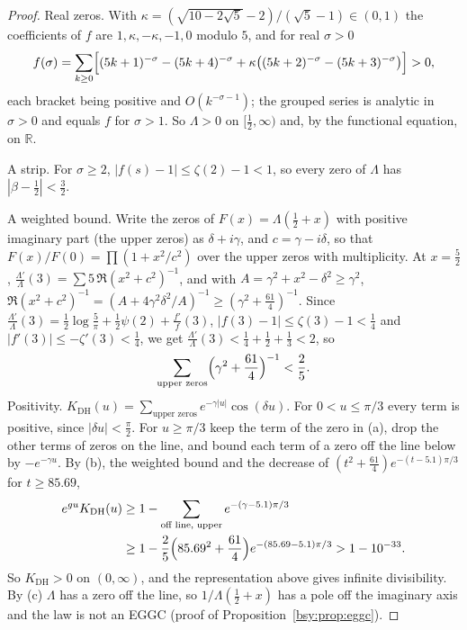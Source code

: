 \begin{proof}
Real zeros. With $\kappa=(\sqrt{10-2\sqrt5}-2)/(\sqrt5-1)\in(0,1)$ the coefficients of $f$ are $1,\kappa,-\kappa,-1,0$ modulo $5$, and for real $\sigma>0$
\[
f(\sigma)=\sum_{k\ge0}\Bigl[(5k+1)^{-\sigma}-(5k+4)^{-\sigma}+\kappa\bigl((5k+2)^{-\sigma}-(5k+3)^{-\sigma}\bigr)\Bigr]>0,
\]
each bracket being positive and $O(k^{-\sigma-1})$; the grouped series is analytic in $\sigma>0$ and equals $f$ for $\sigma>1$. So $\Lambda>0$ on $[\frac12,\infty)$ and, by the functional equation, on $\mathbb R$.

A strip. For $\sigma\ge2$, $|f(s)-1|\le\zeta(2)-1<1$, so every zero of $\Lambda$ has $|\beta-\frac12|<\frac32$.

A weighted bound. Write the zeros of $F(x)=\Lambda(\frac12+x)$ with positive imaginary part (the upper zeros) as $\delta+i\gamma$, and $c=\gamma-i\delta$, so that $F(x)/F(0)=\prod(1+x^2/c^2)$ over the upper zeros with multiplicity. At $x=\frac52$, $\frac{\Lambda'}{\Lambda}(3)=\sum5\,\Re(x^2+c^2)^{-1}$, and with $A=\gamma^2+x^2-\delta^2\ge\gamma^2$, $\Re(x^2+c^2)^{-1}=(A+4\gamma^2\delta^2/A)^{-1}\ge(\gamma^2+\frac{61}4)^{-1}$. Since $\frac{\Lambda'}{\Lambda}(3)=\frac12\log\frac5\pi+\frac12\psi(2)+\frac{f'}{f}(3)$, $|f(3)-1|\le\zeta(3)-1<\frac14$ and $|f'(3)|\le-\zeta'(3)<\frac14$, we get $\frac{\Lambda'}{\Lambda}(3)<\frac14+\frac12+\frac13<2$, so
\[
\sum_{\text{upper zeros}}\Bigl(\gamma^2+\frac{61}4\Bigr)^{-1}<\frac25 .
\]
Positivity. $K_{\mathrm{DH}}(u)=\sum_{\text{upper zeros}}e^{-\gamma|u|}\cos(\delta u)$. For $0<u\le\pi/3$ every term is positive, since $|\delta u|<\frac\pi2$. For $u\ge\pi/3$ keep the term of the zero in (a), drop the other terms of zeros on the line, and bound each term of a zero off the line below by $-e^{-\gamma u}$. By (b), the weighted bound and the decrease of $(t^2+\frac{61}4)e^{-(t-5.1)\pi/3}$ for $t\ge85.69$,
\[
\begin{split}
e^{gu}K_{\mathrm{DH}}(u)&\ge1-\sum_{\text{off line, upper}}e^{-(\gamma-5.1)\pi/3}\\
&\ge1-\frac25\Bigl(85.69^2+\frac{61}4\Bigr)e^{-(85.69-5.1)\pi/3}>1-10^{-33}.
\end{split}
\]
So $K_{\mathrm{DH}}>0$ on $(0,\infty)$, and the representation above gives infinite divisibility. By (c) $\Lambda$ has a zero off the line, so $1/\Lambda(\frac12+x)$ has a pole off the imaginary axis and the law is not an EGGC (proof of Proposition~\ref{bsy:prop:eggc}).


\end{proof}
